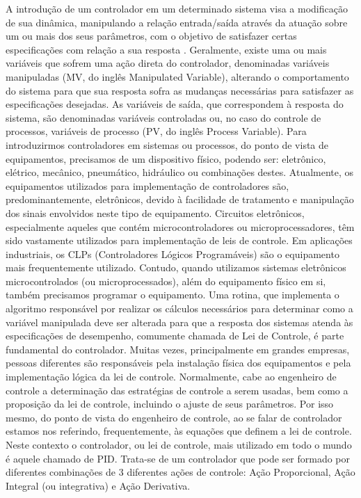 \documentclass[a4paper,12pt]{article}
\begin{document}
\begin{flushleft}

\begin{flushleft}
\hspace{4ex}A introdução de um controlador em um determinado sistema visa a modificação de sua dinâmica, manipulando a relação entrada/saída através da atuação sobre um ou mais dos seus parâmetros, com o objetivo de satisfazer certas especificações com relação a sua resposta \cite{katsuhiko1993engineering}. Geralmente, existe uma ou mais variáveis que sofrem uma ação direta do controlador, denominadas variáveis manipuladas (MV, do inglês Manipulated Variable), alterando o comportamento do sistema para que sua resposta sofra as mudanças necessárias para satisfazer as especificações desejadas. As variáveis de saída, que correspondem à resposta do sistema, são denominadas variáveis controladas ou, no caso do controle de processos, variáveis de processo (PV, do inglês Process Variable). Para introduzirmos controladores em sistemas ou processos, do ponto de vista de equipamentos, precisamos de um dispositivo físico, podendo ser: eletrônico, elétrico, mecânico, pneumático, hidráulico ou combinações destes. Atualmente, os equipamentos utilizados para implementação de controladores são, predominantemente, eletrônicos, devido à facilidade de tratamento e manipulação dos sinais envolvidos neste tipo de equipamento. Circuitos eletrônicos, especialmente aqueles que contém microcontroladores ou microprocessadores, têm sido vastamente utilizados para implementação de leis de controle. Em aplicações industriais, os CLPs (Controladores Lógicos Programáveis) são o equipamento mais frequentemente utilizado. Contudo, quando utilizamos sistemas eletrônicos microcontrolados (ou microprocessados), além do equipamento físico em si, também precisamos programar o equipamento. Uma rotina, que implementa o algoritmo responsável por realizar os cálculos necessários para determinar como a variável manipulada deve ser alterada para que a resposta dos sistemas atenda às especificações de desempenho, comumente chamada de Lei de Controle, é parte fundamental do controlador. Muitas vezes, principalmente em grandes empresas, pessoas diferentes são responsáveis pela instalação física dos equipamentos e pela implementação lógica da lei de controle. Normalmente, cabe ao engenheiro de controle a determinação das estratégias de controle a serem usadas, bem como a proposição da lei de controle, incluindo o ajuste de seus parâmetros. Por isso mesmo, do ponto de vista do engenheiro de controle, ao se falar de controlador estamos nos referindo, frequentemente, às equações que definem a lei de controle. Neste contexto o controlador, ou lei de controle, mais utilizado em todo o mundo é aquele chamado de PID. Trata-se de um controlador que pode ser formado por diferentes combinações de 3 diferentes ações de controle: Ação Proporcional, Ação Integral (ou integrativa) e Ação Derivativa.


\end{flushleft}
\end{flushleft}
\end{document}
